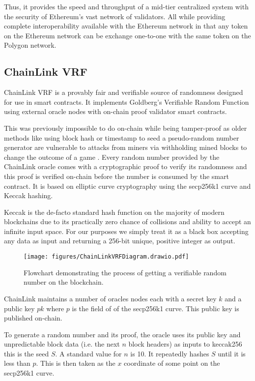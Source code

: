 \documentclass[10pt,journal,compsoc]{IEEEtran}
\begin{document}
Thus, it provides the speed and throughput of a mid-tier centralized system with the security of Ethereum’s vast network of validators. All while providing complete interoperability available with the Ethereum network in that any token on the Ethereum network can be exchange one-to-one with the same token on the Polygon network.
\subsection{ChainLink VRF}
\label{sec:chainlink}
ChainLink \cite{breidenbach2021chainlink} VRF is a provably fair and verifiable source of randomness designed for use in smart contracts. It implements Goldberg’s Verifiable Random Function \cite{cryptoeprint:2017:099} using external oracle nodes with on-chain proof validator smart contracts.

This was previously impossible to do on-chain while being tamper-proof as older methods like using block hash or timestamp to seed a pseudo-random number generator are vulnerable to attacks from miners via withholding mined blocks to change the outcome of a game \cite{Piasecki_2016}. 
Every random number provided by the ChainLink oracle comes with a cryptographic proof to verify its randomness and this proof is verified on-chain before the number is consumed by the smart contract. It is based on elliptic curve cryptography using the secp256k1 curve \cite{sec20002} and Keccak \cite{10.1007/978-3-642-38348-9_19} hashing. 

Keccak is the de-facto standard hash function on the majority of modern blockchains due to its practically zero chance of collisions and ability to accept an infinite input space. For our purposes we simply treat it as a black box accepting any data as input and returning a 256-bit unique, positive integer as output.

\begin{figure}[!h]
    \centering
    \texttt{[image: figures/ChainLinkVRFDiagram.drawio.pdf]}
    \caption{Flowchart demonstrating the process of getting a verifiable random number on the blockchain.}
    \label{fig:chainlinkflow}
\end{figure}

ChainLink maintains a number of oracles nodes each with a secret key $k$ and a public key $pk$ where $p$ is the field of of the secp256k1 curve. This public key is published on-chain.

To generate a random number and its proof, the oracle uses its public key and unpredictable block data (i.e. the next $n$ block headers) as inputs to keccak256 this is the seed $S$. A standard value for $n$ is 10. It repeatedly hashes $S$ until it is less than $p$. This is then taken as the $x$ coordinate of some point on the secp256k1 curve.
\end{document}
